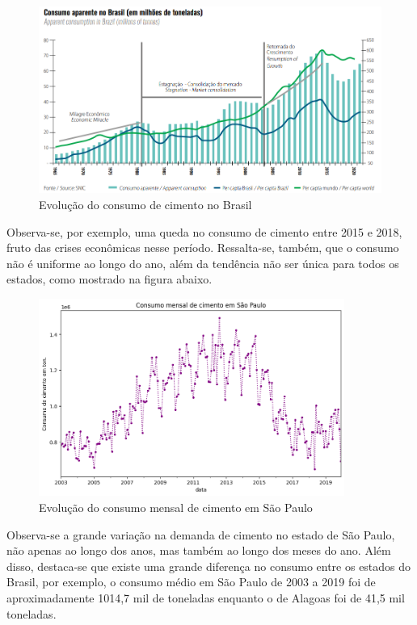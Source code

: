 \begin{figure}[H] 
    \includegraphics[width= 14cm]{../figuras/evolucao-consumo.png}
    \caption{Evolução do consumo de cimento no Brasil \cite{relatorio-snic}}
    \label{fig:evolucao-consumo-cimento}
\end{figure}

Observa-se, por exemplo, uma queda no consumo de cimento entre 2015 e 2018,
fruto das crises econômicas nesse período. Ressalta-se, também,
que o consumo não é uniforme ao longo do ano, além da tendência
não ser única para todos os estados, como mostrado na figura abaixo.

\begin{figure}[H]
    \centering
    \includegraphics[width=10cm]{../figuras/graficos/evolucao-consumo-sp.png}
    \caption{Evolução do consumo mensal de cimento em São Paulo}
\end{figure}

Observa-se a grande variação na demanda de cimento no estado
de São Paulo, não apenas ao longo dos anos, mas também ao 
longo dos meses do ano. Além disso, destaca-se que existe uma 
grande diferença no consumo entre os estados do Brasil, por 
exemplo, o consumo médio em São Paulo de 2003 a 2019 foi de 
aproximadamente 1014,7 mil de toneladas enquanto o de 
Alagoas foi de 41,5 mil toneladas.

